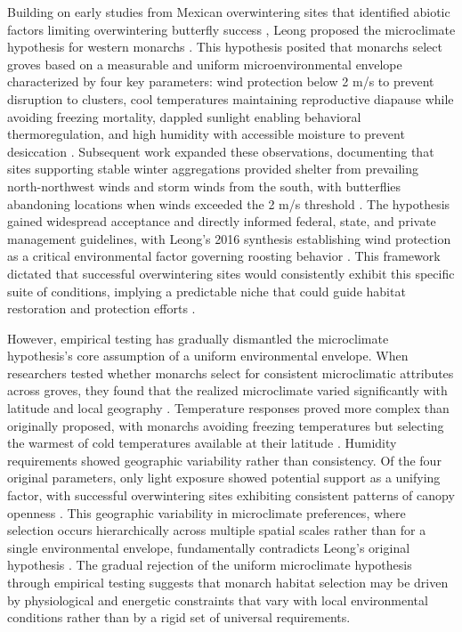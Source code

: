 Building on early studies from Mexican overwintering sites that identified abiotic factors limiting overwintering butterfly success \citep{andersonFreezeProtectionOverwintering1996,calvertEffectRainSnow1983}, Leong proposed the microclimate hypothesis for western monarchs \citep{leongMicroenvironmentalFactorsAssociated1990}. This hypothesis posited that monarchs select groves based on a measurable and uniform microenvironmental envelope characterized by four key parameters: wind protection below 2 m/s to prevent disruption to clusters, cool temperatures maintaining reproductive diapause while avoiding freezing mortality, dappled sunlight enabling behavioral thermoregulation, and high humidity with accessible moisture to prevent desiccation \citep{leongMicroenvironmentalFactorsAssociated1990}. Subsequent work expanded these observations, documenting that sites supporting stable winter aggregations provided shelter from prevailing north-northwest winds and storm winds from the south, with butterflies abandoning locations when winds exceeded the 2 m/s threshold \citep{leongMicroenvironmentalFactorsAssociated1991,leongAnalysisPatternDistribution2004}. The hypothesis gained widespread acceptance and directly informed federal, state, and private management guidelines, with Leong's 2016 synthesis establishing wind protection as a critical environmental factor governing roosting behavior \citep{leongEvaluationManagementCalifornia2016}. This framework dictated that successful overwintering sites would consistently exhibit this specific suite of conditions, implying a predictable niche that could guide habitat restoration and protection efforts \citep{peltonStateMonarchButterfly2016}.

However, empirical testing has gradually dismantled the microclimate hypothesis's core assumption of a uniform environmental envelope. When researchers tested whether monarchs select for consistent microclimatic attributes across groves, they found that the realized microclimate varied significantly with latitude and local geography \citep{sanieeHierarchyScaleInfluence2022}. Temperature responses proved more complex than originally proposed, with monarchs avoiding freezing temperatures but selecting the warmest of cold temperatures available at their latitude \citep{fisherClimaticNicheModel2018}. Humidity requirements showed geographic variability rather than consistency. Of the four original parameters, only light exposure showed potential support as a unifying factor, with successful overwintering sites exhibiting consistent patterns of canopy openness \citep{sanieeHierarchyScaleInfluence2022}. This geographic variability in microclimate preferences, where selection occurs hierarchically across multiple spatial scales rather than for a single environmental envelope, fundamentally contradicts Leong's original hypothesis \citep{fisherClimaticNicheModel2018; sanieeHierarchyScaleInfluence2022}. The gradual rejection of the uniform microclimate hypothesis through empirical testing suggests that monarch habitat selection may be driven by physiological and energetic constraints that vary with local environmental conditions rather than by a rigid set of universal requirements.


